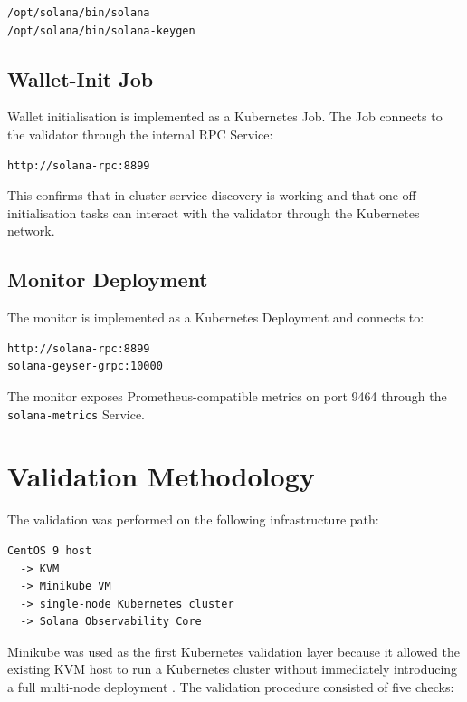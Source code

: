 \documentclass[11pt,a4paper]{article}
\begin{document}
\begin{lstlisting}[style=terminal]
/opt/solana/bin/solana
/opt/solana/bin/solana-keygen
\end{lstlisting}

\subsection{Wallet-Init Job}

Wallet initialisation is implemented as a Kubernetes Job. The Job connects to the validator through the internal RPC Service:

\begin{lstlisting}[style=terminal]
http://solana-rpc:8899
\end{lstlisting}

This confirms that in-cluster service discovery is working and that one-off initialisation tasks can interact with the validator through the Kubernetes network.

\subsection{Monitor Deployment}

The monitor is implemented as a Kubernetes Deployment and connects to:

\begin{lstlisting}[style=terminal]
http://solana-rpc:8899
solana-geyser-grpc:10000
\end{lstlisting}

The monitor exposes Prometheus-compatible metrics on port 9464 through the \texttt{solana-metrics} Service.

\section{Validation Methodology}

The validation was performed on the following infrastructure path:

\begin{lstlisting}[style=terminal]
CentOS 9 host
  -> KVM
  -> Minikube VM
  -> single-node Kubernetes cluster
  -> Solana Observability Core
\end{lstlisting}

Minikube was used as the first Kubernetes validation layer because it allowed the existing KVM host to run a Kubernetes cluster without immediately introducing a full multi-node deployment \citep{kubernetes_docs, minikube_docs, solana_docs, zenodo_versioning, khoshaba_kubernetes_observability_preprint_2026}. The validation procedure consisted of five checks:
\end{document}
